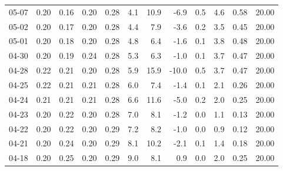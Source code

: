 \begin{threeparttable}
{\begin{tabular}{lrrrrrrrrrrr}
  05-07 &          0.20 &          0.16 &          0.20 &        0.28 &                 4.1 &                10.9 &       -6.9 &                 0.5 &              4.6 &            0.58 &                  20.00 \\
  05-02 &          0.20 &          0.17 &          0.20 &        0.28 &                 4.4 &                 7.9 &       -3.6 &                 0.2 &              3.5 &            0.45 &                  20.00 \\
  05-01 &          0.20 &          0.18 &          0.20 &        0.28 &                 4.8 &                 6.4 &       -1.6 &                 0.1 &              3.8 &            0.48 &                  20.00 \\
  04-30 &          0.20 &          0.19 &          0.24 &        0.28 &                 5.3 &                 6.3 &       -1.0 &                 0.1 &              3.7 &            0.47 &                  20.00 \\
  04-28 &          0.22 &          0.21 &          0.20 &        0.28 &                 5.9 &                15.9 &      -10.0 &                 0.5 &              3.7 &            0.47 &                  20.00 \\
  04-25 &          0.22 &          0.21 &          0.21 &        0.28 &                 6.0 &                 7.4 &       -1.4 &                 0.1 &              2.1 &            0.26 &                  20.00 \\
  04-24 &          0.21 &          0.21 &          0.21 &        0.28 &                 6.6 &                11.6 &       -5.0 &                 0.2 &              2.0 &            0.25 &                  20.00 \\
  04-23 &          0.20 &          0.22 &          0.20 &        0.28 &                 7.0 &                 8.1 &       -1.2 &                 0.0 &              1.1 &            0.13 &                  20.00 \\
  04-22 &          0.20 &          0.22 &          0.20 &        0.29 &                 7.2 &                 8.2 &       -1.0 &                 0.0 &              0.9 &            0.12 &                  20.00 \\
  04-21 &          0.20 &          0.24 &          0.20 &        0.29 &                 8.1 &                10.2 &       -2.1 &                 0.1 &              1.4 &            0.18 &                  20.00 \\
  04-18 &          0.20 &          0.25 &          0.20 &        0.29 &                 9.0 &                 8.1 &        0.9 &                 0.0 &              2.0 &            0.25 &                  20.00 \\

\end{tabular}}
\end{threeparttable}
